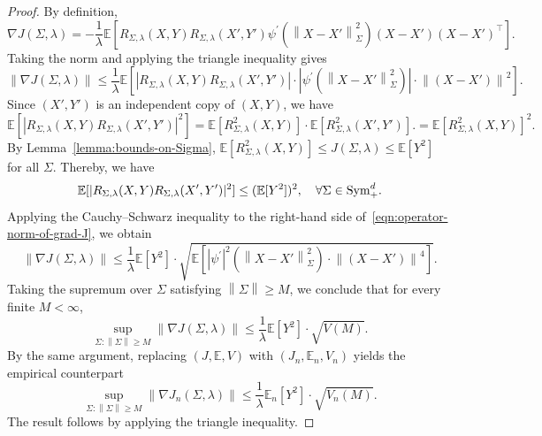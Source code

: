 \documentclass[sn-mathphys-num]{sn-jnl}%
\numberwithin{equation}{section}
\newcommand{\E}{\mathbb{E}}
\newcommand{\norm}[1]{\left\|{#1}\right\|} %
\newcommand{\grad}{\nabla}
\newcommand{\Sym}{{\rm \mathrm{Sym}}}
\theoremstyle{thmstyleone}%
\theoremstyle{thmstyletwo}%
\theoremstyle{thmstylethree}%
\begin{document}
\begin{proof} 
By definition, 
\begin{equation*}
	\grad J(\Sigma, \lambda) = - \frac{1}{\lambda} \E\left[R_{\Sigma, \lambda}(X, Y) R_{\Sigma, \lambda}(X', Y') \psi^\prime(\norm{X-X'}_\Sigma^2) (X-X') (X-X')^\top\right]. 
\end{equation*} 
Taking the norm and applying the triangle inequality gives
\begin{equation}
\label{eqn:operator-norm-of-grad-J}
	\norm{\grad J(\Sigma, \lambda)} \le \frac{1}{\lambda} \E\left[ |R_{\Sigma, \lambda}(X, Y) R_{\Sigma, \lambda}(X', Y')| \cdot | \psi^\prime(\norm{X-X'}_\Sigma^2)| \cdot \norm{(X-X')}^2\right]. 
\end{equation}
Since $(X',Y')$ is an independent copy of $(X,Y)$, we have 
\begin{equation*}
	\E[|R_{\Sigma, \lambda}(X, Y) R_{\Sigma, \lambda}(X', Y')|^2] = \E[R^2_{\Sigma, \lambda}(X, Y)] \cdot \E[R^2_{\Sigma, \lambda}(X', Y')]. 
		=  \E[R^2_{\Sigma, \lambda}(X, Y)]^2.
\end{equation*}
By Lemma~\ref{lemma:bounds-on-Sigma}, $\E[R_{\Sigma, \lambda}^2(X, Y)] \le J(\Sigma, \lambda) \le \E[Y^2]$ for all $\Sigma$. Thereby, we have 
\begin{equation*}
	\E[|R_{\Sigma, \lambda}(X, Y) R_{\Sigma, \lambda}(X', Y')|^2] \le (\E[Y^2])^2,~~~\forall \Sigma \in {\Sym_+^d}.
\end{equation*}
Applying the Cauchy–Schwarz inequality to the right-hand side of~\eqref{eqn:operator-norm-of-grad-J}, we obtain
\begin{equation*}
	\norm{\grad J(\Sigma, \lambda)} \le \frac{1}{\lambda} \E[Y^2] \cdot \sqrt{\E[ |\psi^\prime|^2(\norm{X-X'}_\Sigma^2) \cdot \norm{(X-X')}^4]}.
\end{equation*}
Taking the supremum over $\Sigma$ satisfying $\norm{\Sigma} \ge M$,  we conclude that for every finite $M < \infty$,
\begin{equation*}
	\sup_{\Sigma: \norm{\Sigma} \ge M} \norm{\grad J(\Sigma, \lambda)} \le
			 \frac{1}{\lambda} \E[Y^2] \cdot \sqrt{V(M)}.
\end{equation*}
By the same argument, replacing $(J, \E, V)$ with $(J_n, \E_n, V_n)$ yields the empirical counterpart
\begin{equation*}
	\sup_{\Sigma: \norm{\Sigma} \ge M} \norm{\grad J_n(\Sigma, \lambda)} \le
			 \frac{1}{\lambda} \E_n[Y^2] \cdot \sqrt{V_n(M)}.
\end{equation*}
The result follows by applying the triangle inequality. 
\end{proof} 
\end{document}
